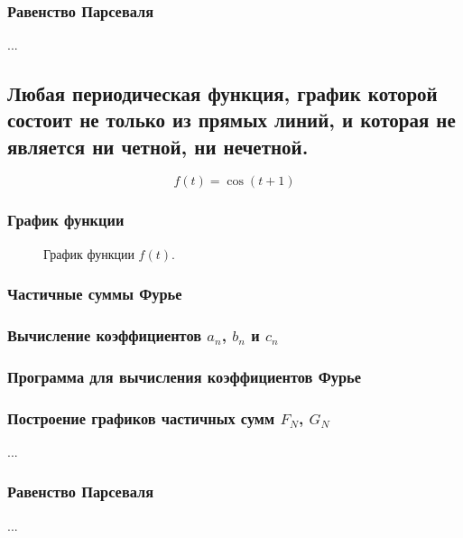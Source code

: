 \documentclass[a5paper, 10pt]{article}
\theoremstyle{definition}
\theoremstyle{plain}
\theoremstyle{remark}
\begin{document}
\newpage
\,
\newpage
\subsubsection{Равенство Парсеваля}

...




\newpage
\subsection{Любая периодическая функция, график которой состоит не только из прямых линий, и которая не является ни четной, ни нечетной.}
\begin{equation}
f(t) = \cos (t + 1)
\end{equation}

\subsubsection{График функции}
\begin{figure}[h]
\caption{График функции $f(t)$.}
\end{figure}

\subsubsection{Частичные суммы Фурье}

\subsubsection{Вычисление коэффициентов $a_n$, $b_n$ и $c_n$}

\subsubsection{Программа для вычисления коэффициентов Фурье}

\subsubsection{Построение графиков частичных сумм $F_N$, $G_N$}

...

\subsubsection{Равенство Парсеваля}

...


 
\end{document}
